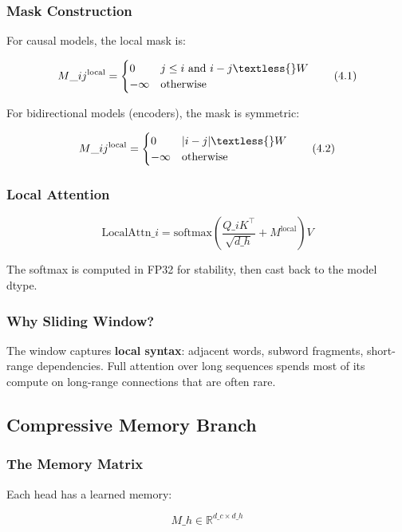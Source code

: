 \subsubsection{Mask Construction}

For causal models, the local mask is:

\[
M\_{ij}^\text{local} = \begin{cases} 0 & j \leq i \text{ and } i - j \textless{} W \\ -\infty & \text{otherwise} \end{cases}
\tag{4.1}
\]

For bidirectional models (encoders), the mask is symmetric:

\[
M\_{ij}^\text{local} = \begin{cases} 0 & |i - j| \textless{} W \\ -\infty & \text{otherwise} \end{cases}
\tag{4.2}
\]

\subsubsection{Local Attention}

\[
\text{LocalAttn}\_i = \text{softmax}\!\left(\frac{Q\_i K^\top}{\sqrt{d\_h}} + M^\text{local}\right) V
\tag{4.3}
\]

The softmax is computed in FP32 for stability, then cast back to the model 
dtype.

\subsubsection{Why Sliding Window?}

The window captures \textbf{local syntax}: adjacent words, subword fragments, 
short-range dependencies. Full attention over long sequences spends most 
of its compute on long-range connections that are often rare.

\subsection{Compressive Memory Branch}

\subsubsection{The Memory Matrix}

Each head has a learned memory:

\[
M\_h \in \mathbb{R}^{d\_c \times d\_h}
\tag{4.4}
\]

